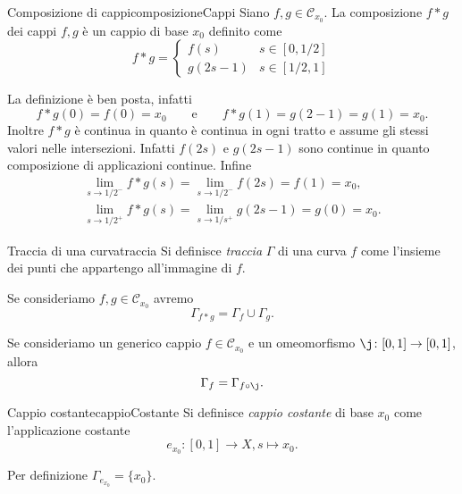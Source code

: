 \begin{defn}{Composizione di cappi}{composizioneCappi}
	Siano \(f,g \in \mathcal{C}_{x_0}\).
	La composizione \(f * g\) dei cappi \(f,g\) è un cappio di base \(x_0\) definito come
	\[
		f*g = 	\begin{cases}
			f(s)    & s\in[0,1/2] \\
			g(2s-1) & s\in[1/2,1]
		\end{cases}
	\]
\end{defn}

\begin{oss}
	La definizione è ben posta, infatti
	\[
		f*g(0) = f(0) = x_0 \qquad\text{e}\qquad f*g(1) = g(2-1) = g(1) = x_0.
	\]
	Inoltre \(f*g\) è continua in quanto è continua in ogni tratto e assume gli stessi valori nelle intersezioni.
	Infatti \(f(2s)\) e \(g(2s-1)\) sono continue in quanto composizione di applicazioni continue.
	Infine
	\begin{gather*}
		\lim_{s\to 1/2^-} f*g(s) = \lim_{s\to 1/2^-} f(2s) = f(1) = x_0,\\
		\lim_{s\to 1/2^+} f*g(s) = \lim_{s\to 1/s^+} g(2s-1) = g(0) = x_0.
	\end{gather*}
\end{oss}

\begin{defn}{Traccia di una curva}{traccia}
	Si definisce \emph{traccia} \(\Gamma\) di una curva \(f\) come l'insieme dei punti che appartengo all'immagine di \(f\).
\end{defn}

\begin{ese}
	Se consideriamo \(f,g\in \mathcal{C}_{x_0}\) avremo
	\[
		\Gamma_{f*g} = \Gamma_f \cup \Gamma_g.
	\]
\end{ese}

\begin{ese}
	Se consideriamo un generico cappio \(f\in \mathcal{C}_{x_0}\) e un omeomorfismo \(\j\colon [0,1] \to [0,1]\), allora
	\[
		\Gamma_f = \Gamma_{f\circ \j}.
	\]
\end{ese}

\begin{defn}{Cappio costante}{cappioCostante}
	Si definisce \emph{cappio costante} di base \(x_0\) come l'applicazione costante
	\[
		e_{x_0}\colon [0,1] \to X, s \mapsto x_0.
	\]
\end{defn}

\begin{oss}
	Per definizione \(\Gamma_{e_{x_0}} = \{x_0\}\).
\end{oss}

